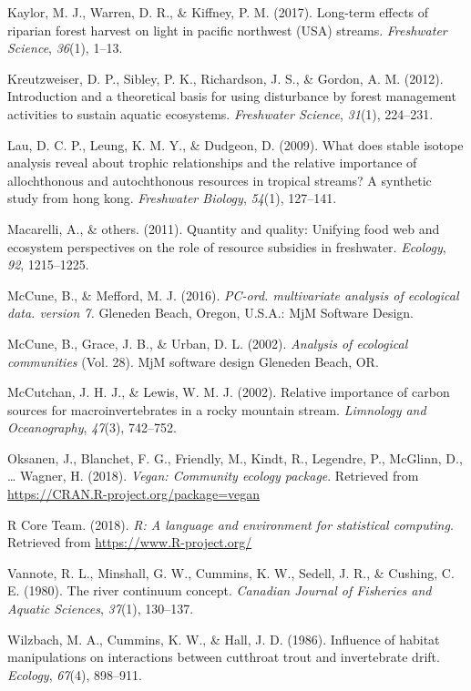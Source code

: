 \documentclass[double,12pt]{beavtex}
\begin{document}
  \hypertarget{refs}{}
  \hypertarget{ref-Kaylor2017FS}{}
  Kaylor, M. J., Warren, D. R., \& Kiffney, P. M. (2017). Long-term
  effects of riparian forest harvest on light in pacific northwest (USA)
  streams. \emph{Freshwater Science}, \emph{36}(1), 1--13.
  
  \hypertarget{ref-Kreutzweiser2012}{}
  Kreutzweiser, D. P., Sibley, P. K., Richardson, J. S., \& Gordon, A. M.
  (2012). Introduction and a theoretical basis for using disturbance by
  forest management activities to sustain aquatic ecosystems.
  \emph{Freshwater Science}, \emph{31}(1), 224--231.
  
  \hypertarget{ref-Lau2009}{}
  Lau, D. C. P., Leung, K. M. Y., \& Dudgeon, D. (2009). What does stable
  isotope analysis reveal about trophic relationships and the relative
  importance of allochthonous and autochthonous resources in tropical
  streams? A synthetic study from hong kong. \emph{Freshwater Biology},
  \emph{54}(1), 127--141.
  
  \hypertarget{ref-Macarelli2011}{}
  Macarelli, A., \& others. (2011). Quantity and quality: Unifying food
  web and ecosystem perspectives on the role of resource subsidies in
  freshwater. \emph{Ecology}, \emph{92}, 1215--1225.
  
  \hypertarget{ref-PC-ORD}{}
  McCune, B., \& Mefford, M. J. (2016). \emph{PC-ord. multivariate
  analysis of ecological data. version 7.} Gleneden Beach, Oregon, U.S.A.:
  MjM Software Design.
  
  \hypertarget{ref-McCune2002}{}
  McCune, B., Grace, J. B., \& Urban, D. L. (2002). \emph{Analysis of
  ecological communities} (Vol. 28). MjM software design Gleneden Beach,
  OR.
  
  \hypertarget{ref-McCutchan2002}{}
  McCutchan, J. H. J., \& Lewis, W. M. J. (2002). Relative importance of
  carbon sources for macroinvertebrates in a rocky mountain stream.
  \emph{Limnology and Oceanography}, \emph{47}(3), 742--752.
  
  \hypertarget{ref-vegan}{}
  Oksanen, J., Blanchet, F. G., Friendly, M., Kindt, R., Legendre, P.,
  McGlinn, D., \ldots{} Wagner, H. (2018). \emph{Vegan: Community ecology
  package}. Retrieved from \url{https://CRAN.R-project.org/package=vegan}
  
  \hypertarget{ref-R-base}{}
  R Core Team. (2018). \emph{R: A language and environment for statistical
  computing}. Retrieved from \url{https://www.R-project.org/}
  
  \hypertarget{ref-Vannote1980}{}
  Vannote, R. L., Minshall, G. W., Cummins, K. W., Sedell, J. R., \&
  Cushing, C. E. (1980). The river continuum concept. \emph{Canadian
  Journal of Fisheries and Aquatic Sciences}, \emph{37}(1), 130--137.
  
  \hypertarget{ref-Wilzbach1986}{}
  Wilzbach, M. A., Cummins, K. W., \& Hall, J. D. (1986). Influence of
  habitat manipulations on interactions between cutthroat trout and
  invertebrate drift. \emph{Ecology}, \emph{67}(4), 898--911.
\end{document}
